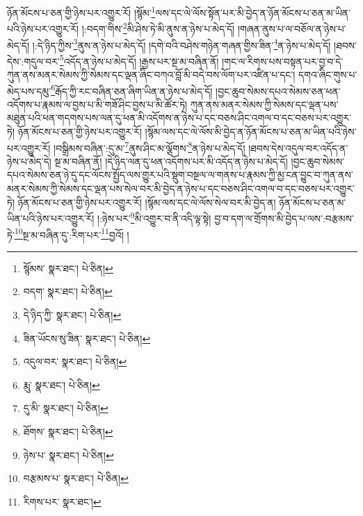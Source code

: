 ཉོན་མོངས་པ་ཅན་གྱི་ཉེས་པར་འགྱུར་རོ། །སྙོམ་\footnote{སྙོམས་  སྣར་ཐང་།  པེ་ཅིན། }ལས་དང་ལེ་ལོས་སྟོན་པར་མི་བྱེད་ན་ཉོན་མོངས་པ་ཅན་མ་ཡིན་པའི་ཉེས་པར་འགྱུར་རོ། །:བདག་གིས་\footnote{བདག་  སྣར་ཐང་།  པེ་ཅིན། }མི་ཤེས་ཏེ་མི་ནུས་ན་ཉེས་པ་མེད་དོ། །གཞན་ནུས་པ་ལ་བཅོལ་ན་ཉེས་པ་མེད་དོ། །:དེ་ཉིད་ཀྱིས་\footnote{དེ་ཉིད་ཀྱི་  སྣར་ཐང་།  པེ་ཅིན། }ནུས་ན་ཉེས་པ་མེད་དོ། །དགེ་བའི་བཤེས་གཉེན་གཞན་གྱིས་ཟིན་\footnote{ཟིན་ཡོངས་སུ་ཟིན་  སྣར་ཐང་།  པེ་ཅིན། }ན་ཉེས་པ་མེད་དོ། །ཐབས་དེས་:གདུལ་བར་\footnote{འདུལ་བར་  སྣར་ཐང་།  པེ་ཅིན། }འདོད་ན་ཉེས་པ་མེད་དོ། །རྒྱས་པར་སྔ་མ་བཞིན་ནོ། །གང་ལ་རིགས་པས་བསྟན་པར་བྱ་བ་དེ་ཀུན་ནས་མནར་སེམས་ཀྱི་སེམས་དང་ལྡན་ཞིང་བཀའ་བློ་མི་བདེ་བས་ལོག་པར་འཛིན་པ་དང་། དགའ་ཞིང་གུས་པ་མེད་པས་དམུ་\footnote{རྨུ་  སྣར་ཐང་།  པེ་ཅིན། }རྒོད་ཀྱི་རང་བཞིན་ཅན་ཞིག་ཡིན་ན་ཉེས་པ་མེད་དོ། །བྱང་ཆུབ་སེམས་དཔའ་སེམས་ཅན་ཕན་འདོགས་པ་རྣམས་ལ་བྱས་པ་མི་གཟོ་ཤིང་བྱས་པ་མི་ཚོར་ཏེ། ཀུན་ནས་མནར་སེམས་ཀྱི་སེམས་དང་ལྡན་པས་མཐུན་པའི་ཕན་གདགས་པས་ལན་དུ་ཕན་མི་འདོགས་ན་ཉེས་པ་དང་བཅས་ཤིང་འགལ་བ་དང་བཅས་པར་འགྱུར་ཏེ། ཉོན་མོངས་པ་ཅན་གྱི་ཉེས་པར་འགྱུར་རོ། །སྙོམ་ལས་དང་ལེ་ལོས་མི་བྱེད་ན་ཉོན་མོངས་པ་ཅན་མ་ཡིན་པའི་ཉེས་པར་འགྱུར་རོ། །བསྒྲིམས་བཞིན་:དུ་མ་\footnote{དུ་མི་  སྣར་ཐང་།  པེ་ཅིན། }ནུས་ཤིང་མ་ལྕོགས་\footnote{ཐོགས་  སྣར་ཐང་།  པེ་ཅིན། }ན་ཉེས་པ་མེད་དོ། །ཐབས་དེས་འདུལ་བར་འདོད་ན་ཉེས་པ་མེད་དེ། སྔ་མ་བཞིན་ནོ། །དེ་ཉིད་ལན་དུ་ཕན་འདོགས་པར་མི་འདོད་ན་ཉེས་པ་མེད་དོ། །བྱང་ཆུབ་སེམས་དཔའ་སེམས་ཅན་ཉེ་དུ་དང་ལོངས་སྤྱོད་ལས་གྱུར་པའི་སྡུག་བསྔལ་ལ་གནས་པ་རྣམས་ཀྱི་མྱ་ངན་བྱུང་བ་ཀུན་ནས་མནར་སེམས་ཀྱི་སེམས་དང་ལྡན་པས་སེལ་བར་མི་བྱེད་ན་ཉེས་པ་དང་བཅས་ཤིང་འགལ་བ་དང་བཅས་པར་འགྱུར་ཏེ། ཉོན་མོངས་པ་ཅན་གྱི་ཉེས་པར་འགྱུར་རོ། །སྙོམ་ལས་དང་ལེ་ལོས་སེལ་བར་མི་བྱེད་ན། ཉོན་མོངས་པ་ཅན་མ་ཡིན་པའི་ཉེས་པར་འགྱུར་རོ། །:ཉེས་པར་\footnote{ཉེས་པ་  སྣར་ཐང་།  པེ་ཅིན། }མི་འགྱུར་བ་ནི་འདི་ལྟ་སྟེ། བྱ་བ་དག་ལ་གྲོགས་མི་བྱེད་པ་ལས་:བརྩམས་ཏེ་\footnote{བརྩམས་པ་  སྣར་ཐང་།  པེ་ཅིན། }སྔ་མ་བཞིན་དུ་:རིག་པར་\footnote{རིགས་པར་  སྣར་ཐང་། }བྱའོ། །

